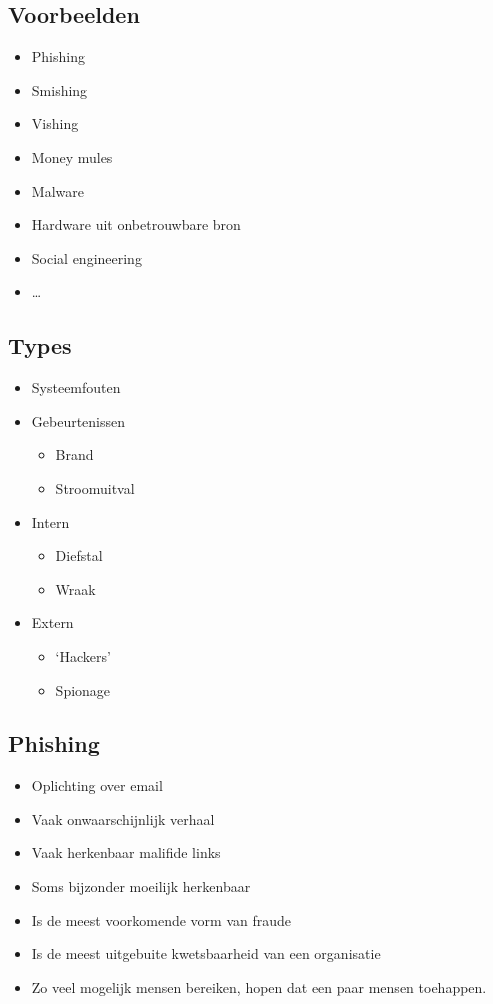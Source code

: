\documentclass{article}
\begin{document}
\subsection{Voorbeelden}

\begin{itemize}
    \item Phishing
    \item Smishing
    \item Vishing
    \item Money mules
    \item Malware
    \item Hardware uit onbetrouwbare bron
    \item Social engineering
    \item \dots
\end{itemize}

\subsection{Types}

\begin{itemize}
    \item Systeemfouten
    \item Gebeurtenissen
    \begin{itemize}
        \item Brand
        \item Stroomuitval
    \end{itemize}
    \item Intern
    \begin{itemize}
        \item Diefstal
        \item Wraak
    \end{itemize}
    \item Extern
    \begin{itemize}
        \item `Hackers'
        \item Spionage
    \end{itemize}
\end{itemize}

\subsection{Phishing}

\begin{itemize}
    \item Oplichting over email
    \item Vaak onwaarschijnlijk verhaal
    \item Vaak herkenbaar malifide links
    \item Soms bijzonder moeilijk herkenbaar
    \item Is de meest voorkomende vorm van fraude
    \item Is de meest uitgebuite kwetsbaarheid van een organisatie
    \item Zo veel mogelijk mensen bereiken, hopen dat een paar mensen toehappen.
\end{itemize}
\end{document}
